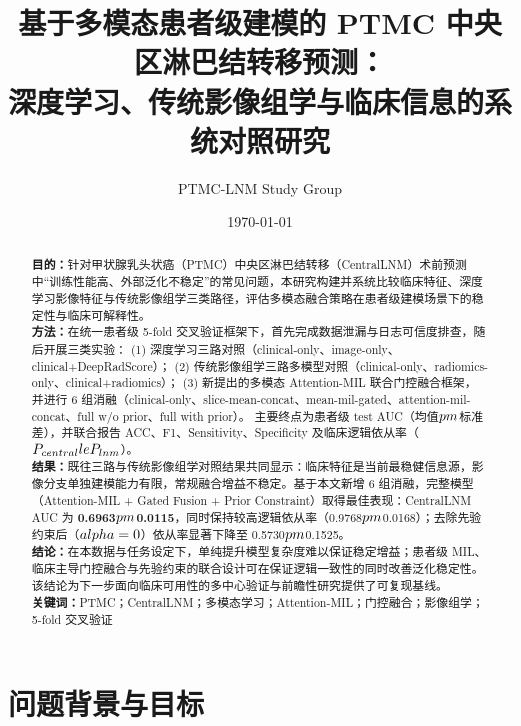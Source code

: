 \documentclass[12pt,a4paper]{ctexart}
\title{基于多模态患者级建模的 PTMC 中央区淋巴结转移预测：\\深度学习、传统影像组学与临床信息的系统对照研究}
\author{PTMC-LNM Study Group}
\date{\today}
\begin{document}
\maketitle

\begin{abstract}
\textbf{目的：}针对甲状腺乳头状癌（PTMC）中央区淋巴结转移（CentralLNM）术前预测中“训练性能高、外部泛化不稳定”的常见问题，本研究构建并系统比较临床特征、深度学习影像特征与传统影像组学三类路径，评估多模态融合策略在患者级建模场景下的稳定性与临床可解释性。\\
\textbf{方法：}在统一患者级 5-fold 交叉验证框架下，首先完成数据泄漏与日志可信度排查，随后开展三类实验：
(1) 深度学习三路对照（clinical-only、image-only、clinical+DeepRadScore）；
(2) 传统影像组学三路多模型对照（clinical-only、radiomics-only、clinical+radiomics）；
(3) 新提出的多模态 Attention-MIL 联合门控融合框架，并进行 6 组消融（clinical-only、slice-mean-concat、mean-mil-gated、attention-mil-concat、full w/o prior、full with prior）。
主要终点为患者级 test AUC（均值$\\pm$标准差），并联合报告 ACC、F1、Sensitivity、Specificity 及临床逻辑依从率（$P_{central}\\le P_{lnm}$）。\\
\textbf{结果：}既往三路与传统影像组学对照结果共同显示：临床特征是当前最稳健信息源，影像分支单独建模能力有限，常规融合增益不稳定。基于本文新增 6 组消融，完整模型（Attention-MIL + Gated Fusion + Prior Constraint）取得最佳表现：CentralLNM AUC 为 \textbf{0.6963$\\pm$0.0115}，同时保持较高逻辑依从率（0.9768$\\pm$0.0168）；去除先验约束后（$\\alpha=0$）依从率显著下降至 0.5730$\\pm$0.1525。\\
\textbf{结论：}在本数据与任务设定下，单纯提升模型复杂度难以保证稳定增益；患者级 MIL、临床主导门控融合与先验约束的联合设计可在保证逻辑一致性的同时改善泛化稳定性。该结论为下一步面向临床可用性的多中心验证与前瞻性研究提供了可复现基线。\\
\textbf{关键词：}PTMC；CentralLNM；多模态学习；Attention-MIL；门控融合；影像组学；5-fold 交叉验证
\end{abstract}

\tableofcontents
\newpage

\section{问题背景与目标}
\end{document}

